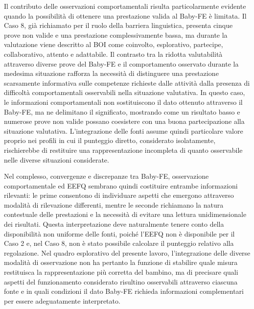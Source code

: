 Il contributo delle osservazioni comportamentali risulta particolarmente evidente quando la possibilità di ottenere una prestazione valida al Baby-FE è limitata. Il Caso 8, già richiamato per il ruolo della barriera linguistica, presenta cinque prove non valide e una prestazione complessivamente bassa, ma durante la valutazione viene descritto al BOI come coinvolto, esplorativo, partecipe, collaborativo, attento e adattabile. Il contrasto tra la ridotta valutabilità attraverso diverse prove del Baby-FE e il comportamento osservato durante la medesima situazione rafforza la necessità di distinguere una prestazione scarsamente informativa sulle competenze richieste dalle attività dalla presenza di difficoltà comportamentali osservabili nella situazione valutativa. In questo caso, le informazioni comportamentali non sostituiscono il dato ottenuto attraverso il Baby-FE, ma ne delimitano il significato, mostrando come un risultato basso e numerose prove non valide possano coesistere con una buona partecipazione alla situazione valutativa. L'integrazione delle fonti assume quindi particolare valore proprio nei profili in cui il punteggio diretto, considerato isolatamente, rischierebbe di restituire una rappresentazione incompleta di quanto osservabile nelle diverse situazioni considerate.

Nel complesso, convergenze e discrepanze tra Baby-FE, osservazione comportamentale ed EEFQ sembrano quindi costituire entrambe informazioni rilevanti: le prime consentono di individuare aspetti che emergono attraverso modalità di rilevazione differenti, mentre le seconde richiamano la natura contestuale delle prestazioni e la necessità di evitare una lettura unidimensionale dei risultati. Questa interpretazione deve naturalmente tenere conto della disponibilità non uniforme delle fonti, poiché l'EEFQ non è disponibile per il Caso 2 e, nel Caso 8, non è stato possibile calcolare il punteggio relativo alla regolazione. Nel quadro esplorativo del presente lavoro, l'integrazione delle diverse modalità di osservazione non ha pertanto la funzione di stabilire quale misura restituisca la rappresentazione più corretta del bambino, ma di precisare quali aspetti del funzionamento considerato risultino osservabili attraverso ciascuna fonte e in quali condizioni il dato Baby-FE richieda informazioni complementari per essere adeguatamente interpretato.

